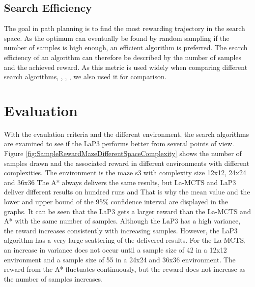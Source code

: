 \documentclass[bibliography=totoc]{scrartcl}
\begin{document}

\subsection{Search Efficiency}
The goal in path planning is to find the most rewarding trajectory in the search space.
As the optimum can eventually be found by random sampling if the number of samples is high enough, an efficient algorithm is preferred.
The search efficiency of an algorithm can therefore be described by the number of samples and the achieved reward.
As this metric is used widely when comparing different search algorithms, \cite{La-MCTS}, \cite{LaNAS}, \cite{VOOT}, we also used it for comparison.




\newpage
\section{Evaluation}


With the evaulation criteria and the different environment, the search algorithms are examined to see if the \ac{LaP3} performs better from several points of view.
Figure \ref{fig:SampleRewardMazeDifferentSpaceComplexity} shows the number of samples drawn and the associated reward in different environments with different complexities.
The environment is the maze s3 with complexity size 12x12, 24x24 and 36x36
The A* always delivers the same results, but \ac{La-MCTS} and \ac{LaP3} deliver different results on hundred runs and 
That is why the mean value and the lower and upper bound of the 95\% confidence interval are displayed in the graphs.
It can be seen that the \ac{LaP3} gets a larger reward than the \ac{La-MCTS} and A* with the same number of samples.
Although the \ac{LaP3} has a high variance, the reward increases consistently with increasing samples.
However, the \ac{LaP3} algorithm has a very large scattering of the delivered results.
For the \ac{La-MCTS}, an increase in variance does not occur until a sample size of 42 in a 12x12 environment and a sample size of 55 in a 24x24 and 36x36 environment.
The reward from the A* fluctuates continuously, but the reward does not increase as the number of samples increases.
\end{document}
